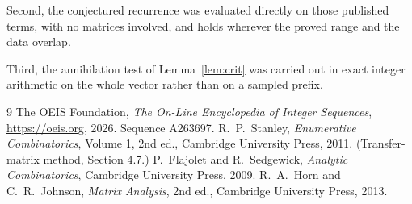 \documentclass[11pt,a4paper]{article}
\theoremstyle{plain}
\theoremstyle{definition}
\begin{document}
Second, the conjectured recurrence was evaluated directly on those published terms, with no
matrices involved, and holds wherever the proved range and the data overlap.

Third, the annihilation test of Lemma~\ref{lem:crit} was carried out in exact integer
arithmetic on the whole vector rather than on a sampled prefix.

\begin{thebibliography}{9}
 The OEIS Foundation, \emph{The On-Line Encyclopedia of Integer
Sequences}, \url{https://oeis.org}, 2026. Sequence A263697.
 R.~P.~Stanley, \emph{Enumerative Combinatorics}, Volume 1, 2nd ed.,
Cambridge University Press, 2011. (Transfer-matrix method, Section 4.7.)
 P.~Flajolet and R.~Sedgewick, \emph{Analytic Combinatorics}, Cambridge
University Press, 2009.
 R.~A.~Horn and C.~R.~Johnson, \emph{Matrix Analysis}, 2nd ed., Cambridge
University Press, 2013.
\end{thebibliography}
\end{document}
